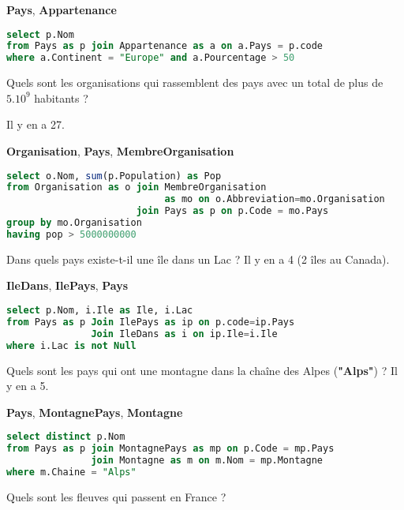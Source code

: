 {\bf Pays}, {\bf Appartenance}
\begin{Answer}
\begin{lstlisting}[language=SQL]
select p.Nom 
from Pays as p join Appartenance as a on a.Pays = p.code
where a.Continent = "Europe" and a.Pourcentage > 50
\end{lstlisting}
\end{Answer}
\begin{Exercise}
Quels sont les organisations qui rassemblent des pays avec un total de plus de $5.10^9$ habitants ?

Il y en a 27.
\end{Exercise}
{\bf Organisation}, {\bf Pays}, {\bf MembreOrganisation}
\begin{Answer}
\begin{lstlisting}[language=SQL]
select o.Nom, sum(p.Population) as Pop 
from Organisation as o join MembreOrganisation 
                            as mo on o.Abbreviation=mo.Organisation
                       join Pays as p on p.Code = mo.Pays
group by mo.Organisation
having pop > 5000000000
\end{lstlisting}
\end{Answer}
\begin{Exercise}
Dans quels pays existe-t-il une île dans un Lac ? Il y en a 4 (2 îles au Canada).
\end{Exercise}
{\bf IleDans}, {\bf IlePays}, {\bf Pays}
\begin{Answer}
\begin{lstlisting}[language=SQL]
select p.Nom, i.Ile as Ile, i.Lac 
from Pays as p Join IlePays as ip on p.code=ip.Pays
               Join IleDans as i on ip.Ile=i.Ile
where i.Lac is not Null
\end{lstlisting}
\end{Answer}
\begin{Exercise}
Quels sont les pays qui ont une montagne dans la chaîne des Alpes ({\bf "Alps"}) ? Il y en a 5.
\end{Exercise}

{\bf Pays}, {\bf MontagnePays}, {\bf Montagne}
\begin{Answer}
\begin{lstlisting}[language=SQL]
select distinct p.Nom
from Pays as p join MontagnePays as mp on p.Code = mp.Pays
               join Montagne as m on m.Nom = mp.Montagne
where m.Chaine = "Alps"
\end{lstlisting}
\end{Answer}
\begin{Exercise}
Quels sont les fleuves qui passent en France ?
\end{Exercise}

